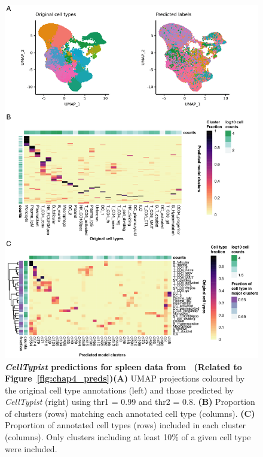 \begin{figure}[pht!] 
\centering
\includegraphics[scale=0.81]{Appendix2/Figs/appB_spleen.png} %
\caption[\textit{CellTypist} predictions for spleen data from~\citep{madissoon_lung_2019}]{\textbf{\textit{CellTypist} predictions for spleen data from~\citep{madissoon_lung_2019} (Related to Figure~\ref{fig:chap4_preds})}\newline\textbf{(A)} UMAP projections coloured by the original cell type annotations (left) and those predicted by \textit{CellTypist} (right) using thr1 = 0.99 and thr2 = 0.8. \textbf{(B)} Proportion of clusters (rows) matching each annotated cell type (columns). \textbf{(C)} Proportion of annotated cell types (rows) included in each cluster (columns). Only clusters including at least 10\% of a given cell type were included.}
\label{fig:appB_spleen}
\end{figure}


